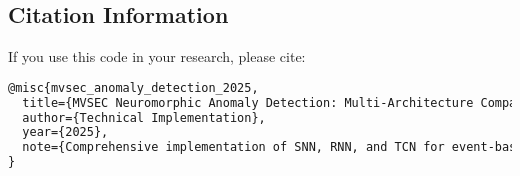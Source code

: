 \documentclass[12pt,a4paper]{article}
\begin{document}
\subsection{Citation Information}

If you use this code in your research, please cite:

\begin{lstlisting}[language=TeX]
@misc{mvsec_anomaly_detection_2025,
  title={MVSEC Neuromorphic Anomaly Detection: Multi-Architecture Comparison},
  author={Technical Implementation},
  year={2025},
  note={Comprehensive implementation of SNN, RNN, and TCN for event-based anomaly detection}
}
\end{lstlisting}
\end{document}
